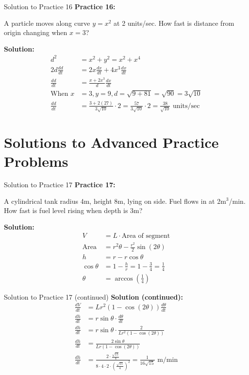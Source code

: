 \documentclass[aspectratio=169]{beamer}
\begin{document}
\begin{frame}{Solution to Practice 16}
\textbf{Practice 16:}

A particle moves along curve $y = x^2$ at 2 units/sec. How fast is distance from origin changing when $x = 3$?

\textbf{Solution:}
\[
\begin{aligned}
  d^2 &= x^2 + y^2 = x^2 + x^4 \\
  2d\frac{dd}{dt} &= 2x\frac{dx}{dt} + 4x^3\frac{dx}{dt} \\
  \frac{dd}{dt} &= \frac{x + 2x^3}{d}\frac{dx}{dt} \\
  \text{When } x &= 3, y = 9, d = \sqrt{9 + 81} = \sqrt{90} = 3\sqrt{10} \\
  \frac{dd}{dt} &= \frac{3 + 2(27)}{3\sqrt{10}} \cdot 2 = \frac{57}{3\sqrt{10}} \cdot 2 = \frac{38}{\sqrt{10}} \text{ units/sec}
\end{aligned}
\]
\end{frame}

\section{Solutions to Advanced Practice Problems}

\begin{frame}{Solution to Practice 17}
\textbf{Practice 17:}

A cylindrical tank radius 4m, height 8m, lying on side. Fuel flows in at 2m$^3$/min. How fast is fuel level rising when depth is 3m?

\textbf{Solution:}
\[
\begin{aligned}
  V &= L \cdot \text{Area of segment} \\
  \text{Area} &= r^2\theta - \frac{r^2}{2}\sin(2\theta) \\
  h &= r - r\cos\theta \\
  \cos\theta &= 1 - \frac{h}{r} = 1 - \frac{3}{4} = \frac{1}{4} \\
  \theta &= \arccos(\frac{1}{4})
\end{aligned}
\]
\end{frame}

\begin{frame}{Solution to Practice 17 (continued)}
\textbf{Solution (continued):}
\[
\begin{aligned}
  \frac{dV}{dt} &= Lr^2(1 - \cos(2\theta))\frac{d\theta}{dt} \\
  \frac{dh}{dt} &= r\sin\theta \cdot \frac{d\theta}{dt} \\
  \frac{dh}{dt} &= r\sin\theta \cdot \frac{2}{Lr^2(1 - \cos(2\theta))} \\
  \frac{dh}{dt} &= \frac{2\sin\theta}{Lr(1 - \cos(2\theta))} \\
  \frac{dh}{dt} &= \frac{2 \cdot \frac{\sqrt{15}}{4}}{8 \cdot 4 \cdot 2 \cdot (\frac{\sqrt{15}}{4})^2} = \frac{1}{16\sqrt{15}} \text{ m/min}
\end{aligned}
\]
\end{frame}
\end{document}
